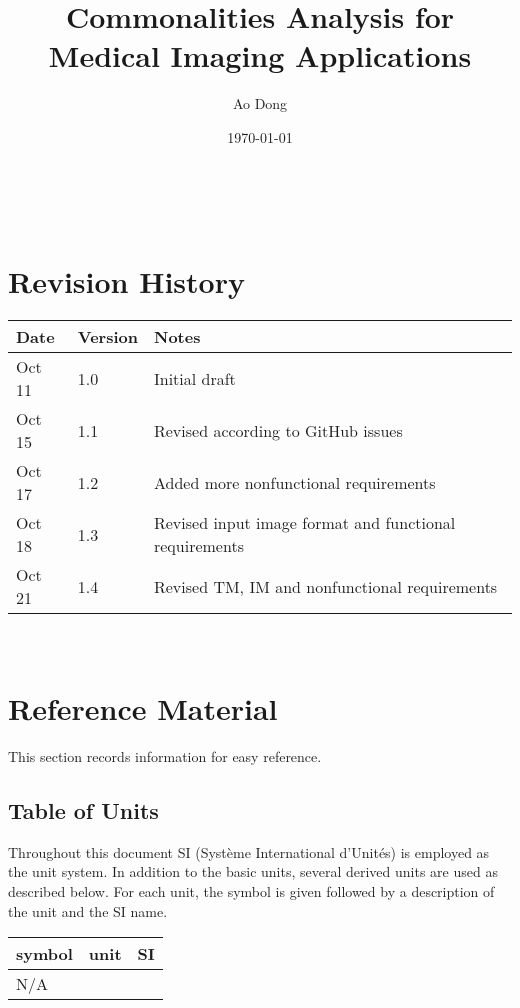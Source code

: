 \documentclass[12pt]{article}
\begin{document}
\title{Commonalities Analysis for Medical Imaging Applications} 
\author{Ao Dong}
\date{\today}

\maketitle

~\newpage


\section{Revision History}

\begin{tabularx}{\textwidth}{p{3cm}p{2cm}X}
\toprule {\bf Date} & {\bf Version} & {\bf Notes}\\
\midrule
Oct 11 & 1.0 & Initial draft\\
Oct 15 & 1.1 & Revised according to GitHub issues\\
Oct 17 & 1.2 & Added more nonfunctional requirements\\
Oct 18 & 1.3 & Revised input image format and functional requirements\\
Oct 21 & 1.4 & Revised TM, IM and nonfunctional requirements\\
\bottomrule
\end{tabularx}

~\newpage
	
\section{Reference Material}

This section records information for easy reference.

\subsection{Table of Units}

Throughout this document SI (Syst\`{e}me International d'Unit\'{e}s) is employed
as the unit system.  In addition to the basic units, several derived units are
used as described below.  For each unit, the symbol is given followed by a
description of the unit and the SI name.
~\newline

\renewcommand{\arraystretch}{1.2}
  \noindent \begin{tabular}{l l l} 
    \toprule		
    \textbf{symbol} & \textbf{unit} & \textbf{SI}\\
    \midrule 
    N/A\\
    \bottomrule
  \end{tabular}
\end{document}
